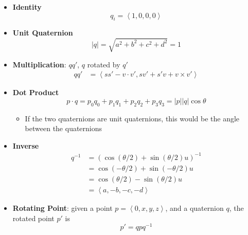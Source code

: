   \begin{itemize}
    \item \textbf{Identity}
    \begin{equation}
      q_{i} = \left< 1, 0, 0, 0 \right>
    \end{equation}

    \item \textbf{Unit Quaternion}
    \begin{equation}
      \left| q \right| = \sqrt{a^{2} + b^{2} + c^{2} + d^{2}} = 1
    \end{equation}

    \item \textbf{Multiplication}: $ q q' $, $ q $ rotated by $ q' $
    \begin{align}
      qq' &= \left< s s' - v \cdot v', s v' + s' v + v \times v' \right>
    \end{align}

    \item \textbf{Dot Product}
    \begin{equation}
      p \cdot q = p_{0} q_{0} + p_{1} q_{1} + p_{2} q_{2} + p_{3} q_{3}
      = \left| p \right| \left| q \right| \cos \theta
    \end{equation}

    \begin{itemize}
      \item If the two quaternions are unit quaternions, this would be the
      angle between the quaternions
    \end{itemize}

    \item \textbf{Inverse}
    \begin{align}
      q^{-1}
      &= \left( \cos\left( \theta / 2 \right) + \sin\left( \theta / 2 \right) u \right)^{-1} \\
      &= \cos\left( - \theta / 2 \right) + \sin\left( - \theta / 2 \right) u \\
      &= \cos\left( \theta / 2 \right) - \sin\left( \theta / 2 \right) u \\
      &= \left< a, -b, -c, -d \right>
    \end{align}

    \item \textbf{Rotating Point}: given a point $ p = \left< 0, x, y, z \right> $,
    and a quaternion $ q $, the rotated point $ p' $ is
    \begin{equation}
      p' = q p q^{-1}
    \end{equation}


\end{itemize}
